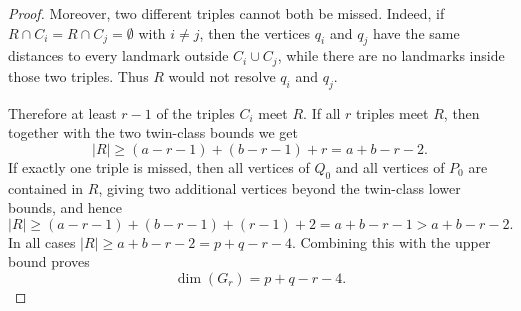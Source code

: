 \documentclass[10pt,a4paper]{amsart}
\begin{document}
\begin{proof}
Moreover, two different triples cannot both be missed. Indeed, if $R\cap C_i=R\cap C_j=\emptyset$ with $i\neq j$, then the vertices $q_i$ and $q_j$ have the same distances to every landmark outside $C_i\cup C_j$, while there are no landmarks inside those two triples. Thus $R$ would not resolve $q_i$ and $q_j$.

Therefore at least $r-1$ of the triples $C_i$ meet $R$. If all $r$ triples meet $R$, then together with the two twin-class bounds we get
$$
|R|\geq (a-r-1)+(b-r-1)+r=a+b-r-2.
$$
If exactly one triple is missed, then all vertices of $Q_0$ and all vertices of $P_0$ are contained in $R$, giving two additional vertices beyond the twin-class lower bounds, and hence
$$
|R|\geq (a-r-1)+(b-r-1)+(r-1)+2=a+b-r-1>a+b-r-2.
$$
In all cases $|R|\geq a+b-r-2=p+q-r-4$. Combining this with the upper bound proves
$$
\dim(G_r)=p+q-r-4.
$$
\end{proof}
\end{document}
